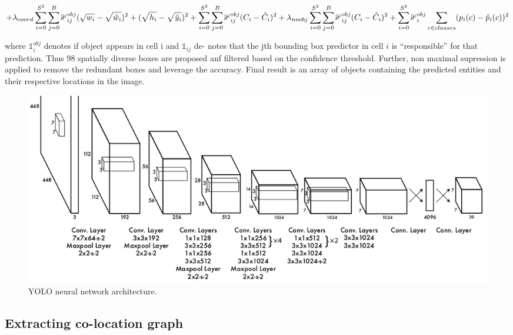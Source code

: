 \documentclass[conference]{IEEEtran}
\begin{document}
{\begin{equation}
        +  \lambda_{coord} \sum_{i=0}^{S^2} \sum_{j=0}^{B} \mathbb{1}_{ij}^{obj} (\sqrt{ w_{i}} - \sqrt{\hat w_{i}})^{2} + (\sqrt{h_{i}} - \sqrt{\hat y_{i}})^{2} \\
        
        +  \sum_{i=0}^{S^2} \sum_{j=0}^{B} \mathbb{1}_{ij}^{obj}(C_{i} - \hat C_{i})^{2} \\
        
        +  \lambda_{noobj} \sum_{i=0}^{S^2} \sum_{j=0}^{B} \mathbb{1}_{ij}^{obj}(C_{i} - \hat C_{i})^{2} \\
        
        +  \sum_{i=0}^{S^2} \mathbb{1}_{i}^{obj} \sum_{c \in classes} (p_{i}(c) - \hat p_{i}(c))^{2}
        \end{equation}
        
       where $ \mathbb{1}^{obj}_{i} $ denotes if object appears in cell i and $ \mathbb{1}_{ij} $ de-
        notes that the jth bounding box predictor in cell $i$ is “responsible” for that prediction. Thus 98 spatially diverse boxes are proposed anf filtered based on the confidence threshold. Further, non maximal supression is applied to remove the redundant boxes and leverage the accuracy. Final result is an array of objects containing the predicted entities and their respective locations in the image.
        


\begin{figure}
  \includegraphics[width=\linewidth]{YOLO}
  \caption{YOLO \cite{yolo} neural network architecture.}
  \label{fig:YOLO}
\end{figure}

    \subsection{Extracting co-location graph}
        
}
\end{document}
